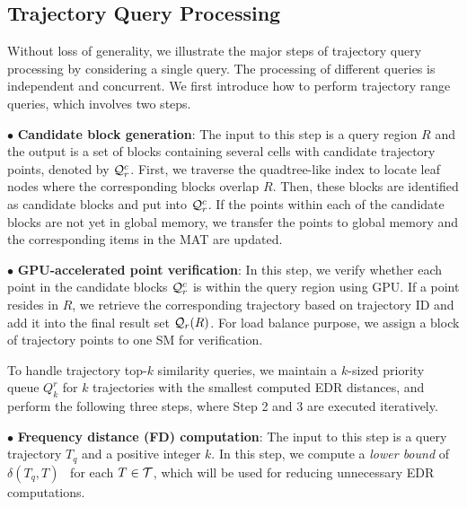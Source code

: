 \documentclass[10pt,conference,letterpaper]{IEEEtran}
\newcommand{\rangeq}{{{\cal Q}_r}\xspace}
\newcommand{\rangecand}{{{\cal Q}_r^c}\xspace}
\newcommand{\alltraj}{{{\cal T}}\xspace}
\newcommand{\edr}{{\delta}\xspace}
\newcommand{\eat}[1]{}
\begin{document}
\subsection{Trajectory Query Processing}

Without loss of generality, we illustrate the major steps of trajectory query processing by considering a single query. The processing of different queries is independent and concurrent.
We first introduce how to perform trajectory range queries, which involves two steps.

\vspace{0.1cm}$\bullet$ {\bf Candidate block generation}:
The input to this step is a query region $R$ and the output is a set of blocks containing several cells with candidate trajectory points, denoted by $\rangecand$. First, we traverse the quadtree-like index to locate leaf nodes where the corresponding blocks overlap $R$.
Then, these blocks are identified as candidate blocks and put into $\rangecand$. If the points within each of the candidate blocks are not yet in global memory, we transfer the points to global memory and the corresponding items in the MAT are updated.
\eat{
We then check if the block is already retained in global memory of the GPU. If not, the block is identified as a candidate block and put into $\rangecand$.
}

\vspace{0.1cm}$\bullet$ {\bf GPU-accelerated point verification}:
In this step, we verify whether each point in the candidate blocks $\rangecand$ is within the query region using GPU. If a point resides in $R$, we retrieve the corresponding trajectory based on trajectory ID and add it into the final result set $\rangeq(R)$. For load balance purpose, we assign a block of trajectory points to one SM for verification.
\eat{
Each CUDA thread is responsible for several continuously stored points in the same block to increase data access throughput.
}

To handle trajectory top-$k$ similarity queries, we maintain a $k$-sized priority queue $Q_{k}^r$ for $k$ trajectories with the smallest computed EDR distances, and perform the following three steps, where Step 2 and 3 are executed iteratively.

\vspace{0.1cm}$\bullet$ {\bf Frequency distance (FD) computation}:
The input to this step is a query trajectory $T_q$ and a positive integer $k$.
In this step, we compute a \emph{lower bound} of $\edr(T_q, T)$~\cite{DBLP:conf/sigmod/ChenOO05} for each $T\in \alltraj$, which will be used for reducing unnecessary EDR computations. 
\end{document}

